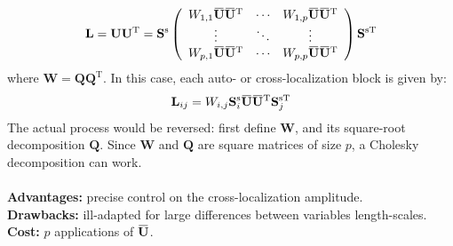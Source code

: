 \documentclass[12pt]{scrartcl}
\newcommand{\overbar}[1]{\mkern 1.5mu\overline{\mkern-1.5mu#1\mkern-1.5mu}\mkern 1.5mu}
\begin{document}
\begin{align}
\mathbf{L} = \mathbf{U} \mathbf{U}^\mathrm{T} = \mathbf{S}^\mathrm{s} \left( \begin{array}{ccc}
W_{1,1} \overbar{\mathbf{U}} \overbar{\mathbf{U}}^\mathrm{T} & \cdots & W_{1,p} \overbar{\mathbf{U}} \overbar{\mathbf{U}}^\mathrm{T} \\
\vdots & \ddots & \vdots  \\
W_{p,1} \overbar{\mathbf{U}} \overbar{\mathbf{U}}^\mathrm{T} & \cdots & W_{p,p} \overbar{\mathbf{U}} \overbar{\mathbf{U}}^\mathrm{T}
\end{array} \right) \mathbf{S}^{\mathrm{s} \mathrm{T}}
\end{align}
where $\mathbf{W} = \mathbf{Q} \mathbf{Q}^\textrm{T}$. In this case, each auto- or cross-localization block is given by: 
\begin{align}
\mathbf{L}_{ij} = W_{i,j} \mathbf{S}^\mathrm{s}_i \overbar{\mathbf{U}} \overbar{\mathbf{U}}^\mathrm{T} \mathbf{S}_j^{\mathrm{s} \mathrm{T}}
\end{align}
The actual process would be reversed: first define $\mathbf{W}$, and its square-root decomposition $\mathbf{Q}$. Since $\mathbf{W}$ and $\mathbf{Q}$ are square matrices of size $p$, a Cholesky decomposition can work.\\
$  $\\
\textbf{Advantages:} precise control on the cross-localization amplitude.\\
\textbf{Drawbacks:} ill-adapted for large differences between variables length-scales.\\
\textbf{Cost:} $p$ applications of $\overbar{\mathbf{U}}$.
\end{document}
